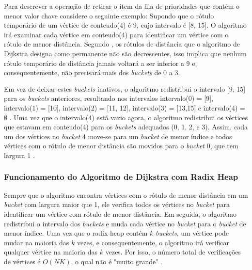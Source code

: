 Para descrever a operação de retirar o item da fila de prioridades que contém o menor valor chave considere o seguinte exemplo:
Supondo que o rótulo temporário de um vértice de conteudo(4) é 9, cujo intervalo é [8, 15].
O algoritmo irá examinar cada vértice em conteudo(4) para identificar um vértice com o rótulo de menor distância.
Segundo \cite{bookahuja}, os rótulos de distância que o algoritmo de Dijkstra designa como permanente não são decrescentes,
isso implica que nenhum rótulo temporário de distância jamais voltará
a ser inferior a 9 e, consequentemente, não precisará mais dos \textit{buckets} de 0 a 3.

Em vez de deixar estes \textit{buckets} inativos, o algoritmo redistribui o intervalo [9, 15]
para os \textit{buckets} anteriores, resultando nos intervalos intervalo(0) = [9], intervalo(1) = [10],
intervalo(2) = [11, 12], intervalo(3) = [13,15] e intervalo(4) = $\emptyset$ . Uma vez que o intervalo(4)
está vazio agora, o algoritmo redistribui os vértices que estavam em conteudo(4) para os \textit{buckets} adequados (0, 1, 2, e 3).
Assim, cada um dos vértices no \textit{bucket} 4 move-se para um \textit{bucket} de menor índice e todos vértices com o rótulo de menor distância
são movidos para o \textit{bucket} 0, que tem largura 1 \cite{bookahuja}.

\subsubsection{Funcionamento do Algoritmo de Dijkstra com Radix Heap}
Sempre que o algoritmo encontra vértices com o rótulo de menor distância em um \textit{bucket} com
largura maior que 1, ele verifica todos os vértices no \textit{bucket} para identificar um vértice com rótulo de menor distância.
Em seguida, o algoritmo redistribui o intervalo dos \textit{buckets} e muda cada vértice no \textit{bucket} para o \textit{bucket} de menor índice.
Uma vez que o radix heap contém $k$ \textit{buckets}, um vértice pode mudar na maioria das $k$ vezes, e consequentemente,
o algoritmo irá verificar qualquer vértice na maioria das $k$ vezes. Por isso, o número total de verificações
de vértices é $O(NK)$, o qual não é "muito grande" \cite{bookahuja}.

